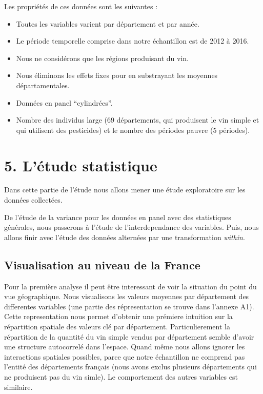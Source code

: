\documentclass[11pt,]{article}
\providecommand{\tightlist}{%
  \setlength{\itemsep}{0pt}\setlength{\parskip}{0pt}}
\begin{document}
Les propriétés de ces données sont les suivantes :

\begin{itemize}
\tightlist
\item
  Toutes les variables varient par département et par année.
\item
  Le période temporelle comprise dans notre échantillon est de 2012 à
  2016.
\item
  Nous ne considérons que les régions produisant du vin.
\item
  Nous éliminons les effets fixes pour en substrayant les moyennes
  départamentales.
\item
  Données en panel ``cylindrées''.
\item
  Nombre des individus large (69 départements, qui produisent le vin
  simple et qui utilisent des pesticides) et le nombre des périodes
  pauvre (5 périodes).
\end{itemize}

\hypertarget{letude-statistique}{%
\section{5. L'étude statistique}\label{letude-statistique}}

Dans cette partie de l'étude nous allons mener une étude exploratoire
sur les données collectées.

De l'étude de la variance pour les données en panel avec des
statistiques générales, nous passerons à l'étude de l'interdependance
des variables. Puis, nous allons finir avec l'étude des données
alternées par une transformation \emph{within}.

\hypertarget{visualisation-au-niveau-de-la-france}{%
\subsection{Visualisation au niveau de la
France}\label{visualisation-au-niveau-de-la-france}}

Pour la première analyse il peut être interessant de voir la situation
du point du vue géographique. Nous visualisons les valeurs moyennes par
département des differentes variables (une partie des répresentation se
trouve dans l'annexe A1). Cette representation nous permet d'obtenir une
prémiere intuition sur la répartition spatiale des valeurs clé par
département. Particulierement la répartition de la quantité du vin
simple vendus par département semble d'avoir une structure autocorrelé
dans l'espace. Quand même nous allons ignorer les interactions spatiales
possibles, parce que notre échantillon ne comprend pas l'entité des
départements français (nous avons exclus plusieurs départements qui ne
produisent pas du vin simle). Le comportement des autres variables est
similaire.
\end{document}
